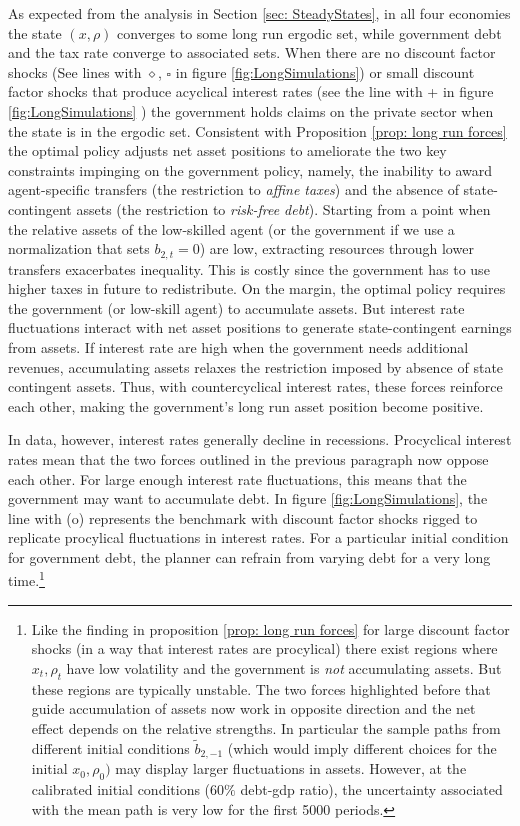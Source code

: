 \documentclass[thmsb,11pt]{article}
\begin{document}
As expected from the analysis in  Section \ref{sec: SteadyStates}, in all four economies the state $(x,\rho)$   converges to some long run
ergodic set, while government debt and the tax rate converge to associated sets. When there are no discount factor shocks
(See lines with {$\diamond$, \scriptsize  $\square$ \normalsize}in figure \ref{fig:LongSimulations}) or small discount factor shocks that produce acyclical interest rates (see the line with + in figure \ref{fig:LongSimulations} )
the government holds claims on the private sector when the state is  in the ergodic set. Consistent with Proposition \ref{prop: long run forces} %
 the optimal policy adjusts  net asset
positions to ameliorate the two key constraints impinging  on the government policy, namely,
the inability to award agent-specific transfers (the restriction to \emph{affine taxes}) and the  absence of state-contingent assets (the
restriction to \emph {risk-free debt}). Starting from a point when the
relative assets of the low-skilled agent (or the government if we use a
 normalization that sets $b_{2,t} = 0$) are low, extracting resources through lower
transfers exacerbates inequality. This is costly since the government has to
use higher taxes in future to redistribute. On the margin, the optimal policy requires the government (or low-skill agent) to accumulate assets. But  interest rate
fluctuations interact with net asset positions to generate state-contingent  earnings
from assets. If interest rate are high when the government needs additional
revenues, accumulating assets relaxes the restriction imposed by absence
of state contingent assets. Thus, with countercyclical interest rates, these
forces reinforce each other, making the government's  long run asset position become positive.

In data, however, interest rates  generally decline in recessions. Procyclical interest rates mean that the
two forces outlined in the previous paragraph now oppose each other.  For  large enough interest rate fluctuations, this means that
the
government may want to accumulate debt. In figure \ref{fig:LongSimulations}, the
line with (o) represents the benchmark with discount factor shocks rigged to
replicate  procylical fluctuations in interest rates. For a particular initial condition for government debt,
the planner can refrain from varying debt for a very  long time.\footnote{Like the finding in proposition \ref{prop: long run forces} for large discount factor shocks (in a way that interest rates are procylical)  there exist
regions where $x_t,\rho_t$ have low volatility and the  government is \emph{not} accumulating assets. But these
regions  are typically unstable. The two forces highlighted before that guide accumulation of assets now work in opposite direction and the net effect depends
on the relative strengths. In particular the sample paths from different initial conditions $\tilde{b}_{2,-1}$ (which would imply different choices for the initial $x_0,\rho_0)$ may display larger fluctuations in assets. However, at the calibrated initial conditions ($60\%$ debt-gdp ratio), the uncertainty associated with the mean path is very low for the first 5000 periods.}
\end{document}
